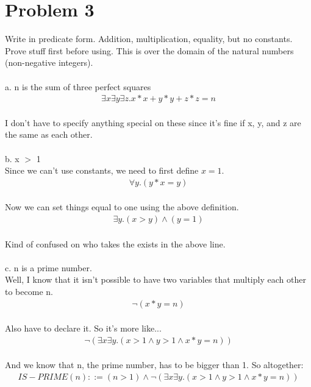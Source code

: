 \documentclass{article}
\begin{document}
\section{Problem 3}

Write in predicate form. Addition, multiplication, equality, but no constants. Prove stuff first before using. This is over the domain of the natural numbers (non-negative integers).
\\\\
a. n is the sum of three perfect squares \\
\begin {align*}
\exists x \exists y \exists z. x*x + y*y + z*z = n
\end {align*}
\\
I don't have to specify anything special on these since it's fine if x, y, and z are the same as each other. 
\\\\
b. x $>$ 1
\\
Since we can't use constants, we need to first define $x = 1$. 
\\
\begin {align*}
\forall y. (y*x = y)
\end {align*}
\\
Now we can set things equal to one using the above definition. 
\\
\begin {align*}
\exists y. (x > y) \wedge (y = 1)
\end {align*}
\\
Kind of confused on who takes the exists in the above line. 
\\\\
c. n is a prime number.
\\
Well, I know that it isn't possible to have two variables that multiply each other to become n. 
\\
\begin {align*}
\neg(x*y = n)
\end {align*}
\\
Also have to declare it. So it's more like...
\\
\begin {align*}
\neg (\exists x \exists y. (x > 1 \wedge y > 1 \wedge x*y = n))
\end {align*}
\\
And we know that n, the prime number, has to be bigger than 1. So altogether:
\\
\begin {align*}
IS-PRIME(n) ::= (n > 1) \wedge \neg (\exists x \exists y. (x > 1 \wedge y > 1 \wedge x*y = n))
\end {align*}
\end{document}
